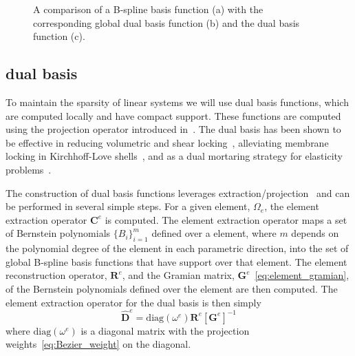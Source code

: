 \begin{figure}[ht]
    \center
    \begin{subfigure}{\linewidth}
        \center
        
        \caption{}\label{fig:b-spline-func}
    \end{subfigure}
    \begin{subfigure}{\linewidth}
        \center
        
        \caption{}\label{fig:global_dual}
    \end{subfigure}
    \begin{subfigure}{\linewidth}
        \center
        
        \caption{}\label{fig:bezier_dual}
    \end{subfigure}
    \caption{A comparison of a B-spline basis function (a) with the corresponding global dual basis function (b) and the \Bezier dual basis function (c).}
    \label{fig:bezier_extraction_illustration}
\end{figure}

\subsection{\Bezier dual basis}

To maintain the sparsity of linear systems we will use \Bezier dual basis functions, which are computed locally and have compact support. These functions are computed using the \Bezier projection operator introduced in~\cite{thomas_bezier_2015}. The \Bezier dual basis has been shown to be effective in reducing volumetric and shear locking~\cite{MIAO2018273}, alleviating membrane locking in Kirchhoff-Love shells~\cite{greco2018reconstructed}, and as a dual mortaring strategy for elasticity problems~\cite{zou2018isogeometric}.

The construction of \Bezier dual basis functions leverages \Bezier extraction/projection~\cite{borden2011isogeometric, thomas2015bezier} and can be performed in several simple steps. For a given \Bezier element, $\Omega_e$, the element extraction operator $\mathbf{C}^e$ is computed. The element extraction operator maps a set of Bernstein polynomials $\{B_i\}_{i=1}^m$ defined over a \Bezier element, where $m$ depends on the polynomial degree of the \Bezier element in each parametric direction, into the set of global B-spline basis functions that have support over that element. The element reconstruction operator, $\mathbf{R}^e$, and the Gramian matrix, $\mathbf{G}^{e}$~\eqref{eq:element_gramian}, of the Bernstein polynomials defined over the element are then computed. The element extraction operator for the dual basis is then simply
\begin{equation}
    \hat{\mathbf{D}}^e=\text{diag}(\omega^e)\mathbf{R}^e\left[\mathbf{G}^{e}\right]^{-1}
\end{equation}
where $\text{diag}(\omega^e)$ is a diagonal matrix with the \Bezier projection weights~\eqref{eq:Bezier_weight} on the diagonal.

